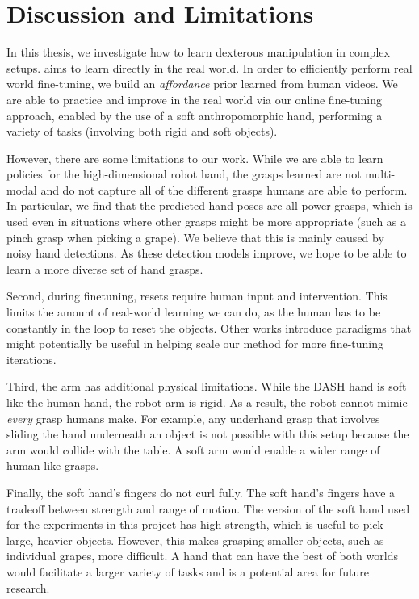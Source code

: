 \section{Discussion and Limitations}
\label{sec:discussion}

In this thesis, we investigate how to learn dexterous manipulation in complex setups. \ours aims to learn directly in the real world. In order to efficiently perform real world fine-tuning, we build an \textit{affordance} prior learned from human videos. We are able to practice and improve in the real world via our online fine-tuning approach, enabled by the use of a soft anthropomorphic hand, performing a variety of tasks (involving both rigid and soft objects).

However, there are some limitations to our work.  While we are able to learn policies for the high-dimensional robot hand, the grasps learned are not multi-modal and do not capture all of the different grasps humans are able to perform.  In particular, we find that the predicted hand poses are all power grasps, which is used even in situations where other grasps might be more appropriate (such as a pinch grasp when picking a grape). We believe that this is mainly caused by noisy hand detections. As these detection models improve, we hope to be able to learn a more diverse set of hand grasps. 

Second, during finetuning, resets require human input and intervention. This limits the amount of real-world learning we can do, as the human has to be constantly in the loop to reset the objects. Other works \cite{chen2022single, guptaYuZhaoKumar2021reset} introduce paradigms that might potentially be useful in helping scale our method for more fine-tuning iterations.

Third, the arm has additional physical limitations. While the DASH hand is soft like the human hand, the robot arm is rigid. As a result, the robot cannot mimic \textit{every} grasp humans make. For example, any underhand grasp that involves sliding the hand underneath an object is not possible with this setup because the arm would collide with the table. A soft arm would enable a wider range of human-like grasps.

Finally, the soft hand's fingers do not curl fully. The soft hand's fingers have a tradeoff between strength and range of motion. The version of the soft hand used for the experiments in this project has high strength, which is useful to pick large, heavier objects. However, this makes grasping smaller objects, such as individual grapes, more difficult. A hand that can have the best of both worlds would facilitate a larger variety of tasks and is a potential area for future research.